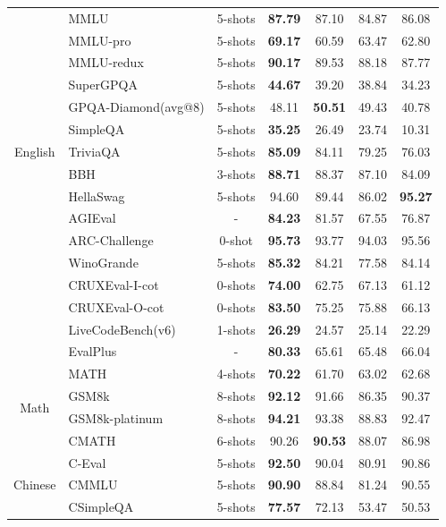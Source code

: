\begin{table}[h]
\begin{tabular}{@{}c l | c | c | c c c}
\midrule
\multirow{13}{*}{English} 
 & MMLU & 5-shots & \textbf{87.79} & 87.10 & 84.87 & 86.08 \\
 & MMLU-pro & 5-shots & \textbf{69.17} & 60.59 & 63.47 & 62.80 \\
 & MMLU-redux & 5-shots & \textbf{90.17} & 89.53 & 88.18 & 87.77 \\
 & SuperGPQA & 5-shots & \textbf{44.67} & 39.20 & 38.84 & 34.23 \\
 & GPQA-Diamond({\tiny avg@8}) & 5-shots & 48.11 & \textbf{50.51} & 49.43 & 40.78 \\
 & SimpleQA & 5-shots & \textbf{35.25} & 26.49 & 23.74 & 10.31 \\
 & TriviaQA & 5-shots & \textbf{85.09} & 84.11 & 79.25 & 76.03 \\
 & BBH & 3-shots & \textbf{88.71} & 88.37 & 87.10 & 84.09 \\
 & HellaSwag & 5-shots & 94.60 & 89.44 & 86.02 & \textbf{95.27} \\
 & AGIEval & - & \textbf{84.23} & 81.57 & 67.55 & 76.87 \\
 & ARC-Challenge & 0-shot & \textbf{95.73} & 93.77 & 94.03 & 95.56 \\
 & WinoGrande & 5-shots & \textbf{85.32} & 84.21 & 77.58 & 84.14 \\
 \midrule
\multirow{4}{*}{Code}
 & CRUXEval-I-cot & 0-shots & \textbf{74.00} & 62.75 & 67.13 & 61.12 \\
 & CRUXEval-O-cot & 0-shots & \textbf{83.50} & 75.25 & 75.88 & 66.13 \\
 & LiveCodeBench(v6) & 1-shots& \textbf{26.29} & 24.57 & 25.14 & 22.29 \\
 & EvalPlus & - & \textbf{80.33} & 65.61 & 65.48 & 66.04 \\
 \midrule
\multirow{4}{*}{Math}  
 & MATH & 4-shots & \textbf{70.22} & 61.70 & 63.02 & 62.68 \\
 & GSM8k & 8-shots & \textbf{92.12} & 91.66 & 86.35 & 90.37 \\
 & GSM8k-platinum & 8-shots & \textbf{94.21} & 93.38 & 88.83 & 92.47 \\
 & CMATH & 6-shots & 90.26 & \textbf{90.53} & 88.07 & 86.98 \\
\midrule
\multirow{3}{*}{Chinese} 
 & C-Eval & 5-shots & \textbf{92.50} & 90.04 & 80.91 & 90.86 \\
 & CMMLU & 5-shots & \textbf{90.90} & 88.84 & 81.24 & 90.55 \\
 & CSimpleQA & 5-shots & \textbf{77.57} & 72.13 & 53.47 & 50.53 \\
\bottomrule
\end{tabular}
\end{table}